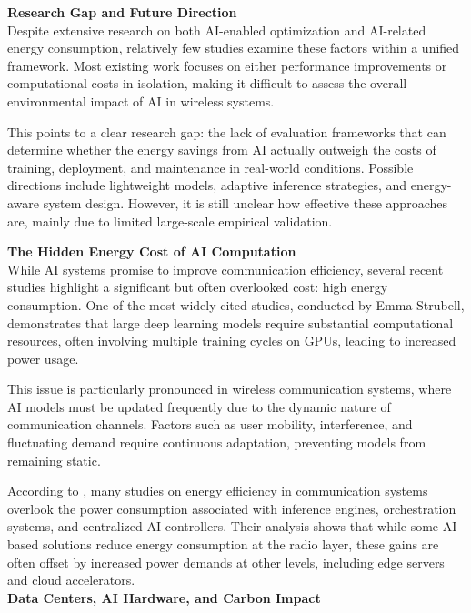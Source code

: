 \documentclass[letterpaper]{article} %
\begin{document}
\textbf{Research Gap and Future Direction}\\

Despite extensive research on both AI-enabled optimization and AI-related energy consumption, relatively few studies examine these factors within a unified framework. Most existing work focuses on either performance improvements or computational costs in isolation, making it difficult to assess the overall environmental impact of AI in wireless systems.

This points to a clear research gap: the lack of evaluation frameworks that can determine whether the energy savings from AI actually outweigh the costs of training, deployment, and maintenance in real-world conditions. Possible directions include lightweight models, adaptive inference strategies, and energy-aware system design. However, it is still unclear how effective these approaches are, mainly due to limited large-scale empirical validation.

\textbf{The Hidden Energy Cost of AI Computation}\\

While AI systems promise to improve communication efficiency, several recent studies highlight a significant but often overlooked cost: high energy consumption. One of the most widely cited studies, conducted by Emma Strubell, demonstrates that large deep learning models require substantial computational resources, often involving multiple training cycles on GPUs, leading to increased power usage.

This issue is particularly pronounced in wireless communication systems, where AI models must be updated frequently due to the dynamic nature of communication channels. Factors such as user mobility, interference, and fluctuating demand require continuous adaptation, preventing models from remaining static.

According to \cite{ezzeddine_survey_2024}, many studies on energy efficiency in communication systems overlook the power consumption associated with inference engines, orchestration systems, and centralized AI controllers. Their analysis shows that while some AI-based solutions reduce energy consumption at the radio layer, these gains are often offset by increased power demands at other levels, including edge servers and cloud accelerators.\\

\textbf{Data Centers, AI Hardware, and Carbon Impact}\\
\end{document}
